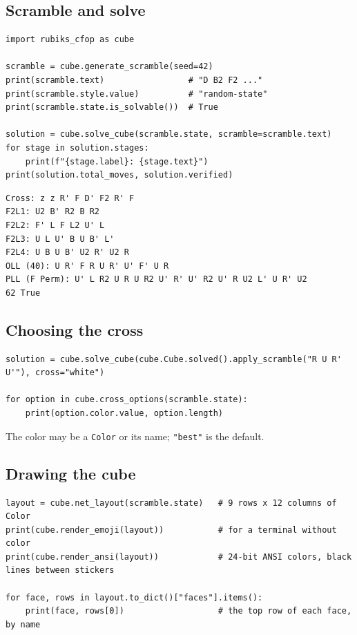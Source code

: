 \subsection{Scramble and solve}

\begin{lstlisting}[style=python]
import rubiks_cfop as cube

scramble = cube.generate_scramble(seed=42)
print(scramble.text)                 # "D B2 F2 ..."
print(scramble.style.value)          # "random-state"
print(scramble.state.is_solvable())  # True

solution = cube.solve_cube(scramble.state, scramble=scramble.text)
for stage in solution.stages:
    print(f"{stage.label}: {stage.text}")
print(solution.total_moves, solution.verified)
\end{lstlisting}

\begin{lstlisting}[style=shell]
Cross: z z R' F D' F2 R' F
F2L1: U2 B' R2 B R2
F2L2: F' L F L2 U' L
F2L3: U L U' B U B' L'
F2L4: U B U B' U2 R' U2 R
OLL (40): U R' F R U R' U' F' U R
PLL (F Perm): U' L R2 U R U R2 U' R' U' R2 U' R U2 L' U R' U2
62 True
\end{lstlisting}

\subsection{Choosing the cross}

\begin{lstlisting}[style=python]
solution = cube.solve_cube(cube.Cube.solved().apply_scramble("R U R' U'"), cross="white")

for option in cube.cross_options(scramble.state):
    print(option.color.value, option.length)
\end{lstlisting}

The color may be a \texttt{Color} or its name; \texttt{"best"} is the default.

\subsection{Drawing the cube}

\begin{lstlisting}[style=python]
layout = cube.net_layout(scramble.state)   # 9 rows x 12 columns of Color
print(cube.render_emoji(layout))           # for a terminal without color
print(cube.render_ansi(layout))            # 24-bit ANSI colors, black lines between stickers

for face, rows in layout.to_dict()["faces"].items():
    print(face, rows[0])                   # the top row of each face, by name
\end{lstlisting}


